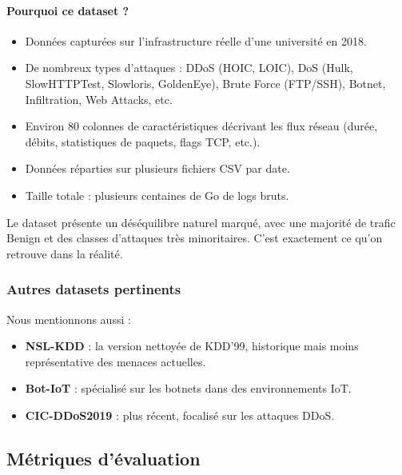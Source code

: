 ﻿\documentclass[11pt,a4paper]{article}
\begin{document}
\paragraph{Pourquoi ce dataset ?}
\begin{itemize}
    \item Données capturées sur l'infrastructure réelle d'une université en 2018.
    \item De nombreux types d'attaques : DDoS (HOIC, LOIC), DoS (Hulk, SlowHTTPTest, Slowloris, GoldenEye), Brute Force (FTP/SSH), Botnet, Infiltration, Web Attacks, etc.
    \item Environ 80 colonnes de caractéristiques décrivant les flux réseau (durée, débits, statistiques de paquets, flags TCP, etc.).
    \item Données réparties sur plusieurs fichiers CSV par date.
    \item Taille totale : plusieurs centaines de Go de logs bruts.
\end{itemize}

Le dataset présente un déséquilibre naturel marqué, avec une majorité de trafic Benign et des classes d'attaques très minoritaires. C'est exactement ce qu'on retrouve dans la réalité.

\subsubsection{Autres datasets pertinents}

Nous mentionnons aussi :
\begin{itemize}
    \item \textbf{NSL-KDD} : la version nettoyée de KDD'99, historique mais moins représentative des menaces actuelles.
    \item \textbf{Bot-IoT} : spécialisé sur les botnets dans des environnements IoT.
    \item \textbf{CIC-DDoS2019} : plus récent, focalisé sur les attaques DDoS.
\end{itemize}

\subsection{Métriques d'évaluation}
\end{document}
